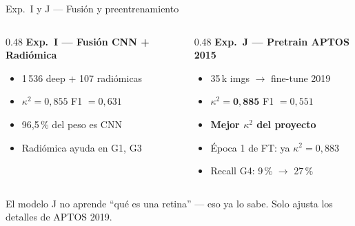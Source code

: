 \documentclass[aspectratio=169, 11pt]{beamer}
\begin{document}
\begin{frame}{Exp.~I y J --- Fusión y preentrenamiento}

  \begin{columns}[T]
    \begin{column}{0.48\textwidth}
      \textbf{Exp.~I --- Fusión CNN + Radiómica}
      \begin{itemize}
        \item 1\,536 deep + 107 radiómicas
        \item $\kappa^2 = 0{,}855$ \quad F1 $= 0{,}631$
        \item 96,5\,\% del peso es CNN
        \item Radiómica ayuda en G1, G3
      \end{itemize}
    \end{column}
    \begin{column}{0.48\textwidth}
      \textbf{Exp.~J --- Pretrain APTOS 2015}
      \begin{itemize}
        \item 35\,k imgs $\to$ fine-tune 2019
        \item $\kappa^2 = \mathbf{0{,}885}$ \quad F1 $= 0{,}551$
        \item \textbf{Mejor $\kappa^2$ del proyecto}
        \item Época 1 de FT: ya $\kappa^2 = 0{,}883$
        \item Recall G4: 9\,\% $\to$ 27\,\%
      \end{itemize}
    \end{column}
  \end{columns}

  \vspace{6pt}
  \centering
  {\small El modelo J no aprende ``qué es una retina'' --- eso ya lo sabe.
   Solo ajusta los detalles de APTOS 2019.}
\end{frame}
\end{document}
